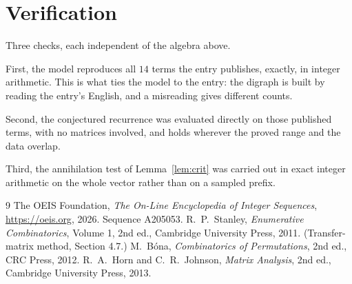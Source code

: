 \documentclass[11pt,a4paper]{article}
\theoremstyle{plain}
\theoremstyle{definition}
\begin{document}
\section{Verification}

Three checks, each independent of the algebra above.

First, the model reproduces all $14$ terms the entry publishes, exactly, in integer
arithmetic. This is what ties the model to the entry: the digraph is built by reading the
entry's English, and a misreading gives different counts.

Second, the conjectured recurrence was evaluated directly on those published terms, with no
matrices involved, and holds wherever the proved range and the data overlap.

Third, the annihilation test of Lemma~\ref{lem:crit} was carried out in exact integer
arithmetic on the whole vector rather than on a sampled prefix.

\begin{thebibliography}{9}
 The OEIS Foundation, \emph{The On-Line Encyclopedia of Integer
Sequences}, \url{https://oeis.org}, 2026. Sequence A205053.
 R.~P.~Stanley, \emph{Enumerative Combinatorics}, Volume 1, 2nd ed.,
Cambridge University Press, 2011. (Transfer-matrix method, Section 4.7.)
 M.~B\'ona, \emph{Combinatorics of Permutations}, 2nd ed., CRC
Press, 2012.
 R.~A.~Horn and C.~R.~Johnson, \emph{Matrix Analysis}, 2nd ed., Cambridge
University Press, 2013.
\end{thebibliography}
\end{document}
